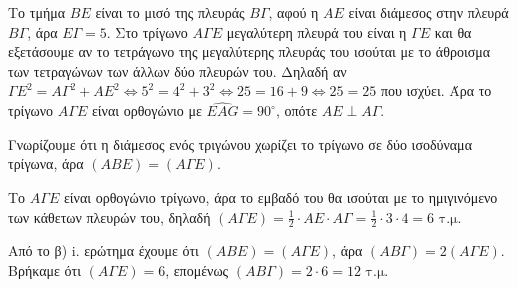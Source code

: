 \begin{alist}
    \item Το τμήμα $BE$ είναι το μισό της πλευράς $B\Gamma$, αφού η $AE$ είναι διάμεσος στην πλευρά $B\Gamma$, άρα $E\Gamma=5$. Στο τρίγωνο $A\Gamma E$ μεγαλύτερη πλευρά του είναι η $\Gamma E$ και θα εξετάσουμε αν το τετράγωνο της μεγαλύτερης πλευράς του ισούται με το άθροισμα των τετραγώνων των άλλων δύο πλευρών του. Δηλαδή αν $\Gamma E^2 = A\Gamma^2 + AE^2 \Leftrightarrow 5^2 = 4^2 + 3^2 \Leftrightarrow 25 = 16+9 \Leftrightarrow 25 = 25$ που ισχύει. Άρα το τρίγωνο $A\Gamma E$ είναι ορθογώνιο με $\widehat{EAG} = 90^{\circ}$, οπότε $AE \perp A\Gamma$. 
    \item 
    \begin{rlist}
        \item Γνωρίζουμε ότι η διάμεσος ενός τριγώνου χωρίζει το τρίγωνο σε δύο ισοδύναμα τρίγωνα, άρα $(ABE) = (A\Gamma E)$.
        \item Το $A\Gamma E$ είναι ορθογώνιο τρίγωνο, άρα το εμβαδό του θα ισούται με το ημιγινόμενο των κάθετων πλευρών του, δηλαδή $(A\Gamma E) = \frac{1}{2} \cdot AE \cdot A\Gamma = \frac{1}{2} \cdot 3 \cdot 4 = 6 \text{ τ.μ.}$
    \end{rlist}
    Από το β) i. ερώτημα έχουμε ότι $(ABE)=(A\Gamma E)$, άρα $(AB\Gamma)=2(A\Gamma E)$. Βρήκαμε ότι $(A\Gamma E)=6$, επομένως $(AB\Gamma) = 2 \cdot 6 = 12 \text{ τ.μ.}$ 
\end{alist}
